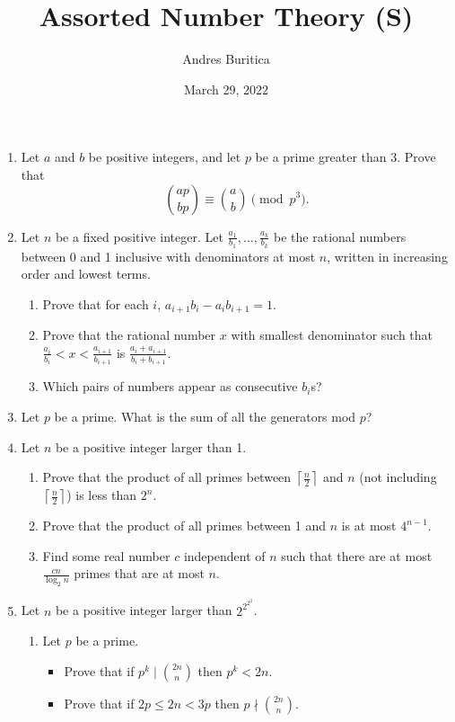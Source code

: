 \documentclass{article}
\title{Assorted Number Theory (S)}
\author{Andres Buritica}
\date{March 29, 2022}
\begin{document}
\maketitle
\begin{enumerate}
  \item Let $a$ and $b$ be positive integers, and let $p$ be a prime greater
    than 3. Prove that
    \[\binom{ap}{bp}\equiv\binom ab\pmod {p^3}.\]
  \item Let $n$ be a fixed positive integer. Let
    $\frac{a_1}{b_1},\ldots,\frac{a_k}{b_k}$ be the rational numbers between 0
    and 1 inclusive with denominators at most $n$, written in increasing order
    and lowest terms.
    \begin{enumerate}
      \item Prove that for each $i$, $a_{i+1}b_i-a_ib_{i+1}=1$.
      \item Prove that the rational number $x$ with smallest denominator such
        that $\frac{a_i}{b_i}<x<\frac{a_{i+1}}{b_{i+1}}$ is
        $\frac{a_i+a_{i+1}}{b_i+b_{i+1}}$. 
      \item Which pairs of numbers appear as consecutive $b_i$s?
    \end{enumerate}
  \item Let $p$ be a prime. What is the sum of all the generators mod $p$?
  \item
    Let $n$ be a positive integer larger than 1.
    \begin{enumerate}
      \item Prove that the product of all primes between $\left\lceil\frac
        n2\right\rceil$ and $n$
        (not including $\left\lceil\frac n2\right\rceil$) is less than $2^n$.
      \item Prove that the product of all primes between 1 and $n$ is at most
        $4^{n-1}$.
      \item Find some real number $c$ independent of $n$ such that there are at
        most $\frac{cn}{\log_2 n}$ primes that are at most $n$.
    \end{enumerate}
  \item 
    Let $n$ be a positive integer larger than $2^{2^{2^2}}$.
    \begin{enumerate}
      \item Let $p$ be a prime.
        \begin{itemize}
          \item Prove that if $p^k\mid\binom{2n}n$ then $p^k<
            2n$.
          \item Prove that if $2p\le 2n< 3p$ then $p\nmid\binom{2n}n$.

\end{itemize}
\end{enumerate}
\end{enumerate}
\end{document}

